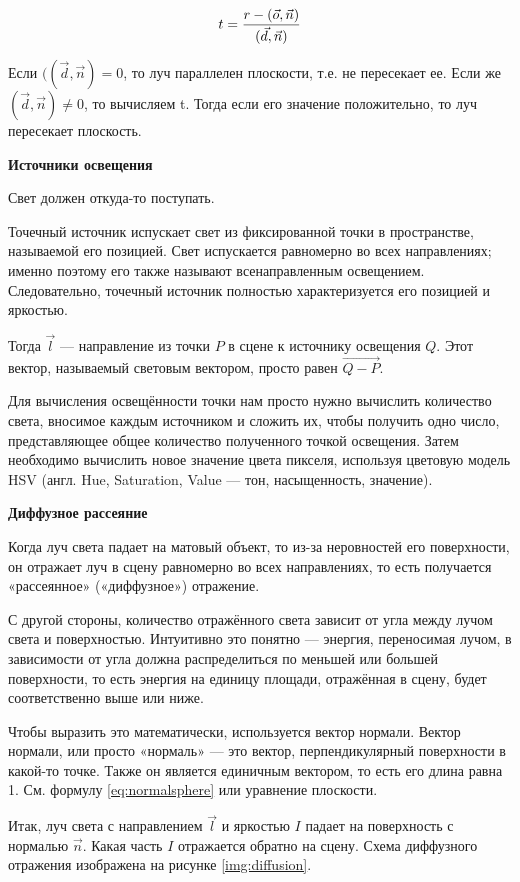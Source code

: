 \begin{equation}
	\centering
	t = \frac{r - (\vec o, \vec n)}{(\vec d, \vec n)}
	\label{eq:otvet}
\end{equation}

Если $((\vec d, \vec n)= 0$, то луч параллелен плоскости, т.е. не пересекает ее. Если же $(\vec d, \vec n) \ne 0$, то вычисляем t. Тогда если его значение положительно, то луч пересекает плоскость.

\textbf{Источники освещения}

Свет должен откуда-то поступать. 

Точечный источник испускает свет из фиксированной точки в пространстве, называемой его позицией. Свет испускается равномерно во всех направлениях; именно поэтому его также называют всенаправленным освещением. Следовательно, точечный источник полностью характеризуется его позицией и яркостью.

Тогда $\vec l$ --- направление из точки $P$ в сцене к источнику освещения $Q$. Этот вектор, называемый световым вектором, просто равен  $\overrightarrow{Q-P}$. 

Для вычисления освещённости точки нам просто нужно вычислить количество света, вносимое каждым источником и сложить их, чтобы получить одно число, представляющее общее количество полученного точкой освещения. Затем необходимо вычислить новое значение цвета пикселя, используя цветовую модель HSV (англ. Hue, Saturation, Value — тон, насыщенность, значение). 

\textbf{Диффузное рассеяние}

Когда луч света падает на матовый объект, то из-за неровностей его поверхности, он отражает луч в сцену равномерно во всех направлениях, то есть получается «рассеянное» («диффузное») отражение.

С другой стороны, количество отражённого света зависит от угла между лучом света и поверхностью. Интуитивно это понятно --- энергия, переносимая лучом, в зависимости от угла должна распределиться по меньшей или большей поверхности, то есть энергия на единицу площади, отражённая в сцену, будет соответственно выше или ниже. 

Чтобы выразить это математически, используется вектор нормали. Вектор нормали, или просто «нормаль» — это вектор, перпендикулярный поверхности в какой-то точке. Также он является единичным вектором, то есть его длина равна 1. См. формулу \ref{eq:normalsphere} или уравнение плоскости. 

Итак, луч света с направлением $\vec l$ и яркостью $I$ падает на поверхность с нормалью $\vec n$. Какая часть $I$ отражается обратно на сцену. Схема диффузного отражения изображена на рисунке \ref{img:diffusion}. 

